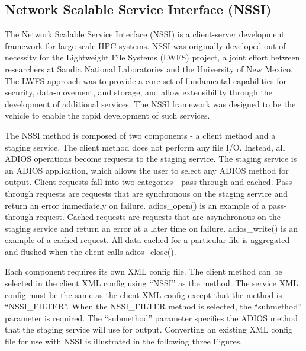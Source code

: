 
\subsection{Network Scalable Service Interface (NSSI)}

The Network Scalable Service Interface (NSSI) is a client-server development framework 
for large-scale HPC systems.  NSSI was originally developed out of necessity for 
the Lightweight File Systems (LWFS) project, a joint effort between researchers 
at Sandia National Laboratories and the University of New Mexico.  The LWFS approach 
was to provide a core set of fundamental capabilities for security, data-movement, 
and storage, and allow extensibility through the development of additional services. 
 The NSSI framework was designed to be the vehicle to enable the rapid development 
of such services.

The NSSI method is composed of two components - a client method and a staging service. 
 The client method does not perform any file I/O.  Instead, all ADIOS operations 
become requests to the staging service.  The staging service is an ADIOS application, 
which allows the user to select any ADIOS method for output.  Client requests fall 
into two categories - pass-through and cached.  Pass-through requests are requests 
that are synchronous on the staging service and return an error immediately on 
failure.  adios\_open() is an example of a pass-through request.  Cached requests 
are requests that are asynchronous on the staging service and return an error at 
a later time on failure.  adios\_write() is an example of a cached request.  All 
data cached for a particular file is aggregated and flushed when the client calls 
adios\_close().

Each component requires its own XML config file.  The client method can be selected 
in the client XML config using ``NSSI'' as the method.  The service XML config 
must be the same as the client XML config except that the method is ``NSSI\_FILTER''. 
 When the NSSI\_FILTER method is selected, the ``submethod'' parameter is required. 
 The ``submethod'' parameter specifies the ADIOS method that the staging service 
will use for output.  Converting an existing XML config file for use with NSSI 
is illustrated in the following three Figures.

